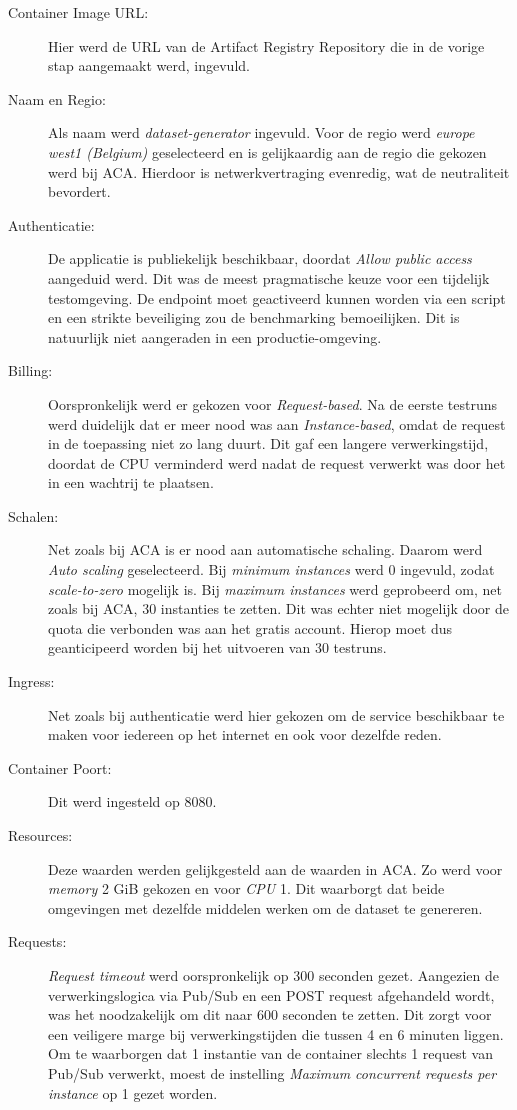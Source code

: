 \begin{description}
    \item[Container Image URL:] 
    Hier werd de URL van de Artifact Registry Repository die in de vorige stap aangemaakt werd, ingevuld.
    \item[Naam en Regio:] 
    Als naam werd \textit{dataset-generator} ingevuld. Voor de regio werd \textit{europe west1 (Belgium)} geselecteerd en is gelijkaardig aan de regio die gekozen werd bij ACA. Hierdoor is netwerkvertraging evenredig, wat de neutraliteit bevordert. 
    \item[Authenticatie:] 
    De applicatie is publiekelijk beschikbaar, doordat \textit{Allow public access} aangeduid werd. Dit was de meest pragmatische keuze voor een tijdelijk testomgeving. De endpoint moet geactiveerd kunnen worden via een script en een strikte beveiliging zou de benchmarking bemoeilijken. Dit is natuurlijk niet aangeraden in een productie-omgeving.
    \item[Billing:] 
    Oorspronkelijk werd er gekozen voor \textit{Request-based}. Na de eerste testruns werd duidelijk dat er meer nood was aan \textit{Instance-based}, omdat de request in de toepassing niet zo lang duurt. Dit gaf een langere verwerkingstijd, doordat de CPU verminderd werd nadat de request verwerkt was door het in een wachtrij te plaatsen. 
    \item[Schalen:] 
    Net zoals bij ACA is er nood aan automatische schaling. Daarom werd \textit{Auto scaling} geselecteerd. Bij \textit{minimum instances} werd 0 ingevuld, zodat \textit{scale-to-zero} mogelijk is. Bij \textit{maximum instances} werd geprobeerd om, net zoals bij ACA, 30 instanties te zetten. Dit was echter niet mogelijk door de quota die verbonden was aan het gratis account. Hierop moet dus geanticipeerd worden bij het uitvoeren van 30 testruns.
    \item[Ingress:] 
    Net zoals bij authenticatie werd hier gekozen om de service beschikbaar te maken voor iedereen op het internet en ook voor dezelfde reden.
    \item[Container Poort:] 
    Dit werd ingesteld op 8080. 
    \item[Resources:] 
    Deze waarden werden gelijkgesteld aan de waarden in ACA. Zo werd voor \textit{memory} 2 GiB gekozen en voor \textit{CPU} 1. Dit waarborgt dat beide omgevingen met dezelfde middelen werken om de dataset te genereren.
    \item[Requests:] 
    \textit{Request timeout} werd oorspronkelijk op 300 seconden gezet. Aangezien de verwerkingslogica via Pub/Sub en een POST request afgehandeld wordt, was het noodzakelijk om dit naar 600 seconden te zetten. Dit zorgt voor een veiligere marge bij verwerkingstijden die tussen 4 en 6 minuten liggen. Om te waarborgen dat 1 instantie van de container slechts 1 request van Pub/Sub verwerkt, moest de instelling \textit{Maximum concurrent requests per instance} op 1 gezet worden.

\end{description}
